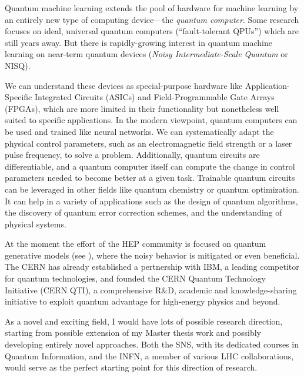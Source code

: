 \documentclass{scrartcl} %
\begin{document}
Quantum machine learning extends the pool of hardware for machine learning by an entirely new type of computing device—the \emph{quantum computer}. Some research focuses on ideal, universal quantum computers (“fault-tolerant QPUs”) which are still years away. But there is rapidly-growing interest in quantum machine learning on near-term quantum devices (\emph{Noisy Intermediate-Scale Quantum} or NISQ).

We can understand these devices as special-purpose hardware like Application-Specific Integrated Circuits (ASICs) and Field-Programmable Gate Arrays (FPGAs), which are more limited in their functionality but nonetheless well suited to specific applications. In the modern viewpoint, quantum computers can be used and trained like neural networks. We can systematically adapt the physical control parameters, such as an electromagnetic field strength or a laser pulse frequency, to solve a problem. Additionally, quantum circuits are differentiable, and a quantum computer itself can compute the change in control parameters needed to become better at a given task. Trainable quantum circuits can be leveraged in other fields like quantum chemistry or quantum optimization. It can help in a variety of applications such as the design of quantum algorithms, the discovery of quantum error correction schemes, and the understanding of physical systems.

At the moment the effort of the HEP community is focused on quantum generative models (see \cite{chan2021quantum}), where the noisy behavior is mitigated or even beneficial. The CERN has already established a pertnership with IBM, a leading competitor for quantum technologies, and founded the CERN Quantum Technology Initiative (CERN QTI), a comprehensive R$\&$D, academic and knowledge-sharing initiative to exploit quantum advantage for high-energy physics and beyond. 

As a novel and exciting field, I would have lots of possible research direction, starting from possible extension of my Master thesis work and possibly developing entirely novel approaches. Both the SNS, with its dedicated courses in Quantum Information, and the INFN, a member of various LHC collaborations, would serve as the perfect starting point for this direction of research.

	
	
	
\end{document}
